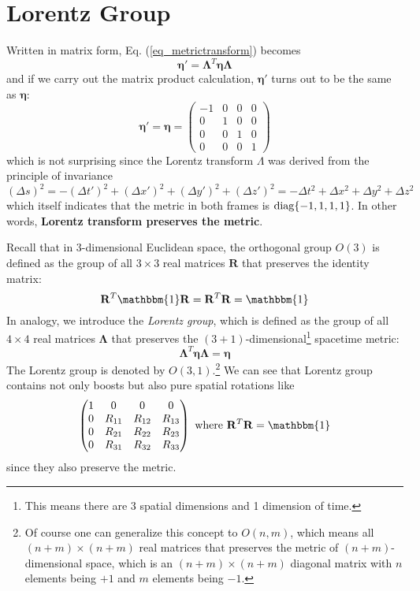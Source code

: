\documentclass[11pt]{article}
\begin{document}
\section{Lorentz Group}

Written in matrix form, Eq. (\ref{eq_metrictransform}) becomes
\begin{equation}
    \bm{\eta}'=\mathbf{\Lambda}^T\bm{\eta}\mathbf{\Lambda}
\end{equation}
and if we carry out the matrix product calculation, $\bm{\eta}'$ turns out to be the same as $\bm{\eta}$:
\begin{equation}
    \bm{\eta}'=\bm{\eta}=\begin{pmatrix}
        -1 & 0 & 0 & 0 \\
        0 & 1 & 0 & 0 \\
        0 & 0 & 1 & 0 \\
        0 & 0 & 0 & 1
    \end{pmatrix}
\end{equation}
which is not surprising since the Lorentz transform $\Lambda$ was derived from the principle of invariance $\left(\Delta s\right)^2=-(\Delta t')^2+(\Delta x')^2+(\Delta y')^2+(\Delta z')^2=-\Delta t^2+\Delta x^2+\Delta y^2+\Delta z^2$ which itself indicates that the metric in both frames is ${\rm diag}\{-1,1,1,1\}$. In other words, \textbf{Lorentz transform preserves the metric}.

Recall that in 3-dimensional Euclidean space, the orthogonal group $O(3)$ is defined as the group of all $3\times3$ real matrices $\mathbf{R}$ that preserves the identity matrix:
\begin{equation}
    \mathbf{R}^T\mathbbm{1}\mathbf{R}=\mathbf{R}^T\mathbf{R}=\mathbbm{1}
\end{equation}
In analogy, we introduce the \textit{Lorentz group}, which is defined as the group of all $4\times4$ real matrices $\mathbf{\Lambda}$ that preserves the $(3+1)$-dimensional\footnote{This means there are 3 spatial dimensions and 1 dimension of time.} spacetime metric:
\begin{equation}
    \mathbf{\Lambda}^T\bm{\eta}\mathbf{\Lambda}=\bm{\eta}
\end{equation}
The Lorentz group is denoted by $O(3,1)$.\footnote{
    Of course one can generalize this concept to $O(n,m)$, which means all $(n+m)\times(n+m)$ real matrices that preserves the metric of $(n+m)$-dimensional space, which is an $(n+m)\times(n+m)$ diagonal matrix with $n$ elements being $+1$ and $m$ elements being $-1$.
}
We can see that Lorentz group contains not only boosts but also pure spatial rotations like
\[
    \begin{pmatrix}
        1 & 0 & 0 & 0 \\
        0 & R_{11} & R_{12} & R_{13} \\
        0 & R_{21} & R_{22} & R_{23} \\
        0 & R_{31} & R_{32} & R_{33}
    \end{pmatrix}\text{ where }\mathbf{R}^T\mathbf{R}=\mathbbm{1}
\]
since they also preserve the metric.
\end{document}
